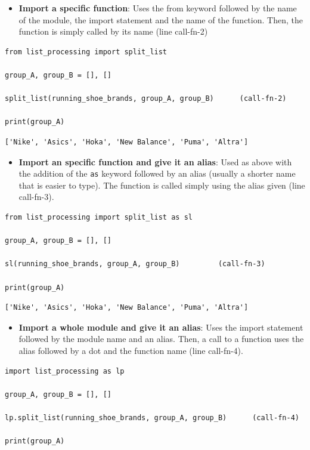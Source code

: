 \documentclass[10pt]{book}
\begin{document}
\begin{itemize}
\item \textbf{Import a specific function}: Uses the from keyword followed by the name of the module, the import statement and the name of the function. Then, the function is simply called by its name (line call-fn-2)
\end{itemize}
\label{org051f95e}
\begin{verbatim}
from list_processing import split_list

group_A, group_B = [], []

split_list(running_shoe_brands, group_A, group_B)      (call-fn-2)

print(group_A)
\end{verbatim}

\label{orga445f45}
\begin{verbatim}
['Nike', 'Asics', 'Hoka', 'New Balance', 'Puma', 'Altra']
\end{verbatim}

\begin{itemize}
\item \textbf{Import an specific function and give it an alias}: Used as above with the addition of the \texttt{as} keyword followed by an alias (usually a shorter name that is easier to type). The function is called simply using the alias given (line call-fn-3).
\end{itemize}
\label{org3a6b887}
\begin{verbatim}
from list_processing import split_list as sl

group_A, group_B = [], []

sl(running_shoe_brands, group_A, group_B)         (call-fn-3)

print(group_A)
\end{verbatim}

\label{org9a32b3c}
\begin{verbatim}
['Nike', 'Asics', 'Hoka', 'New Balance', 'Puma', 'Altra']
\end{verbatim}

\begin{itemize}
\item \textbf{Import a whole module and give it an alias}: Uses the import statement followed by the module name and an alias. Then, a call to a function uses the alias followed by a dot and the function name (line call-fn-4).
\end{itemize}
\label{org586cd91}
\begin{verbatim}
import list_processing as lp

group_A, group_B = [], []

lp.split_list(running_shoe_brands, group_A, group_B)      (call-fn-4)

print(group_A)
\end{verbatim}
\end{document}
